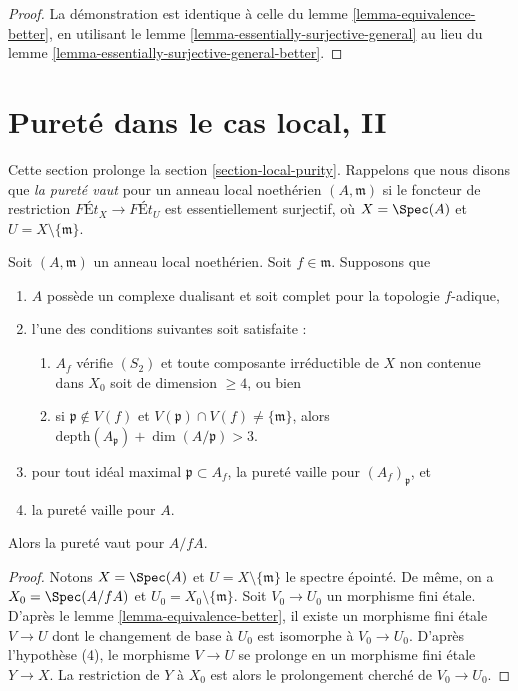 \begin{proof}
La démonstration est identique à celle du
lemme \ref{lemma-equivalence-better},
en utilisant le
lemme \ref{lemma-essentially-surjective-general}
au lieu du
lemme \ref{lemma-essentially-surjective-general-better}.
\end{proof}



\section{Pureté dans le cas local, II}
\label{section-local-purity-II}

\noindent
Cette section prolonge la section \ref{section-local-purity}.
Rappelons que nous disons que {\it la pureté vaut} pour un anneau local noethérien
$(A, \mathfrak m)$ si le foncteur de restriction
$\textit{F\'Et}_X \to \textit{F\'Et}_U$ est essentiellement
surjectif, où $X = \Spec(A)$ et $U = X \setminus \{\mathfrak m\}$.

\begin{lemma}
\label{lemma-purity-inherited-by-hypersurface-better}
Soit $(A, \mathfrak m)$ un anneau local noethérien.
Soit $f \in \mathfrak m$. Supposons que
\begin{enumerate}
\item $A$ possède un complexe dualisant et soit complet pour la topologie $f$-adique,
\item l'une des conditions suivantes soit satisfaite :
\begin{enumerate}
\item $A_f$ vérifie $(S_2)$ et toute composante irréductible de $X$
non contenue dans $X_0$ soit de dimension $\geq 4$, ou bien
\item si $\mathfrak p \not \in V(f)$ et
$V(\mathfrak p) \cap V(f) \not = \{\mathfrak m\}$, alors
$\text{depth}(A_\mathfrak p) + \dim(A/\mathfrak p) > 3$.
\end{enumerate}
\item pour tout idéal maximal $\mathfrak p \subset A_f$,
la pureté vaille pour $(A_f)_\mathfrak p$, et
\item la pureté vaille pour $A$.
\end{enumerate}
Alors la pureté vaut pour $A/fA$.
\end{lemma}

\begin{proof}
Notons $X = \Spec(A)$ et $U = X \setminus \{\mathfrak m\}$
le spectre épointé. De même, on a $X_0 = \Spec(A/fA)$
et $U_0 = X_0 \setminus \{\mathfrak m\}$.
Soit $V_0 \to U_0$ un morphisme fini étale. D'après le
lemme \ref{lemma-equivalence-better},
il existe un morphisme fini étale $V \to U$
dont le changement de base à $U_0$
est isomorphe à $V_0 \to U_0$.
D'après l'hypothèse (4), le morphisme $V \to U$ se prolonge
en un morphisme fini étale $Y \to X$. La restriction de
$Y$ à $X_0$ est alors le prolongement cherché de $V_0 \to U_0$.
\end{proof}

